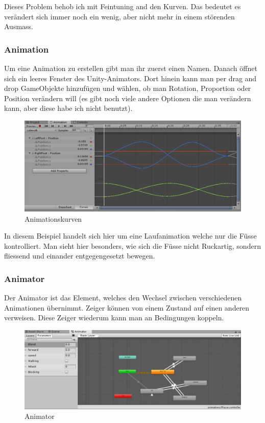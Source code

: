 Dieses Problem behob ich mit Feintuning and den Kurven.
Das bedeutet es verändert sich immer noch ein wenig, aber nicht mehr in einem störenden Ausmass.

\subsubsection{Animation}
Um eine Animation zu erstellen gibt man ihr zuerst einen Namen.
Danach öffnet sich ein leeres Fenster des Unity-Animators.
Dort hinein kann man per drag and drop GameObjekte hinzufügen und wählen, ob man Rotation, Proportion oder Position verändern will (es gibt noch viele andere Optionen die man verändern 
kann, aber diese habe ich nicht benutzt).

\begin{figure}[H]
\includegraphics[scale=0.7]{screenshots/animations.png}
\caption{Animationskurven}
\end{figure}

In diesem Beispiel handelt sich hier um eine Laufanimation welche nur die Füsse kontrolliert.
Man sieht hier besonders, wie sich die Füsse nicht Ruckartig, sondern fliessend und einander entgegengesetzt bewegen.

\subsubsection{Animator}
Der Animator ist das Element, welches den Wechsel zwischen verschiedenen Animationen übernimmt.
Zeiger können von einem Zustand auf einen anderen verweisen.
Diese Zeiger wiederum kann man an Bedingungen koppeln.
\begin{figure}[H]
\includegraphics[scale=0.7]{screenshots/animator.png}
\caption{Animator}
\end{figure}

